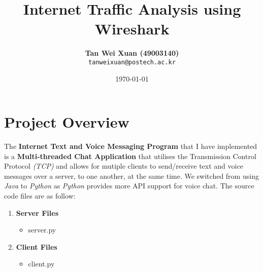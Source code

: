 \documentclass[a4paper,11pt]{article}
\begin{document}
\title{\vspace{-1.0cm}\textbf{Internet Traffic Analysis using Wireshark}}
\author{
  \textbf{Tan Wei Xuan (49003140)}\\
  \texttt{tanweixuan@postech.ac.kr}
}
\date{\today}
\maketitle

\section{Project Overview}
The\textbf{ Internet Text and Voice Messaging Program} that I have implemented is a \textbf{Multi-threaded Chat Application} that utilises the Transmission Control Protocol \textit{(TCP)} and allows for mutiple clients to send/receive text and voice messages over a server, to one another, at the same time.  We switched from using \textit{Java} to \textit{Python} as \textit{Python} provides more API support for voice chat. The source code files are as follow:
\begin{enumerate}
	\item \textbf{Server Files}
\begin{itemize}
  	\item server.py
\end{itemize}
	\item \textbf{Client Files}
\begin{itemize}
  	\item client.py
\end{itemize}
\end{enumerate}
\end{document}
